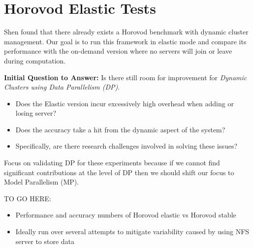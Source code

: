\section{Horovod Elastic Tests}
Shen found that there already exists a Horovod benchmark with dynamic
cluster management.
Our goal is to run this framework in elastic mode and compare its performance
with the on-demand version where no servers will join or leave during
computation.

\vspace{1em}
\textbf{Initial Question to Answer:} Is there still room for improvement for
\emph{Dynamic Clusters using Data Parallelism (DP)}.
\begin{itemize}
    \item Does the Elastic version incur excessively high overhead when
      adding or losing server?
    \item Does the accuracy take a hit from the dynamic aspect of the system?
    \item Specifically, are there research challenges involved in solving these
      issues?
\end{itemize}

\vspace{1em}
Focus on validating DP for these experiments because if we cannot find significant
contributions at the level of DP then we should shift our focus to Model
Parallelism (MP).

\vspace{2em}
TO GO HERE:
\begin{itemize}
    \item Performance and accuracy numbers of Horovod elastic vs Horovod stable
    \item Ideally run over several attempts to mitigate variability caused by
      using NFS server to store data
\end{itemize}

